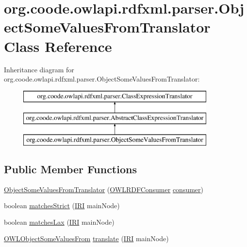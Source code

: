 \hypertarget{classorg_1_1coode_1_1owlapi_1_1rdfxml_1_1parser_1_1_object_some_values_from_translator}{\section{org.\-coode.\-owlapi.\-rdfxml.\-parser.\-Object\-Some\-Values\-From\-Translator Class Reference}
\label{classorg_1_1coode_1_1owlapi_1_1rdfxml_1_1parser_1_1_object_some_values_from_translator}
}
Inheritance diagram for org.\-coode.\-owlapi.\-rdfxml.\-parser.\-Object\-Some\-Values\-From\-Translator\-:\begin{figure}[H]
\begin{center}
\leavevmode
\includegraphics[height=3.000000cm]{classorg_1_1coode_1_1owlapi_1_1rdfxml_1_1parser_1_1_object_some_values_from_translator}
\end{center}
\end{figure}
\subsection*{Public Member Functions}
\begin{DoxyCompactItemize}
\item 
\hyperlink{classorg_1_1coode_1_1owlapi_1_1rdfxml_1_1parser_1_1_object_some_values_from_translator_a3f4d5720dc604cc0c4d469672506d2ca}{Object\-Some\-Values\-From\-Translator} (\hyperlink{classorg_1_1coode_1_1owlapi_1_1rdfxml_1_1parser_1_1_o_w_l_r_d_f_consumer}{O\-W\-L\-R\-D\-F\-Consumer} \hyperlink{classorg_1_1coode_1_1owlapi_1_1rdfxml_1_1parser_1_1_abstract_class_expression_translator_ae547084cdd5b92c03835b5aa404f823b}{consumer})
\item 
boolean \hyperlink{classorg_1_1coode_1_1owlapi_1_1rdfxml_1_1parser_1_1_object_some_values_from_translator_a75d8a5d14e23211cbef82454f45152da}{matches\-Strict} (\hyperlink{classorg_1_1semanticweb_1_1owlapi_1_1model_1_1_i_r_i}{I\-R\-I} main\-Node)
\item 
boolean \hyperlink{classorg_1_1coode_1_1owlapi_1_1rdfxml_1_1parser_1_1_object_some_values_from_translator_a896ac56b7335241599da2d79d574d473}{matches\-Lax} (\hyperlink{classorg_1_1semanticweb_1_1owlapi_1_1model_1_1_i_r_i}{I\-R\-I} main\-Node)
\item 
\hyperlink{interfaceorg_1_1semanticweb_1_1owlapi_1_1model_1_1_o_w_l_object_some_values_from}{O\-W\-L\-Object\-Some\-Values\-From} \hyperlink{classorg_1_1coode_1_1owlapi_1_1rdfxml_1_1parser_1_1_object_some_values_from_translator_a6a6b4846a0af30046324f0d84fa54d76}{translate} (\hyperlink{classorg_1_1semanticweb_1_1owlapi_1_1model_1_1_i_r_i}{I\-R\-I} main\-Node)
\end{DoxyCompactItemize}
